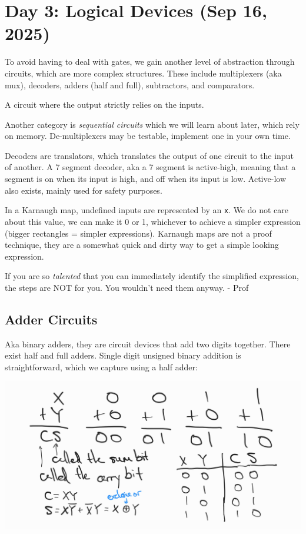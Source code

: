 \section{Day 3: Logical Devices (Sep 16, 2025)}

To avoid having to deal with gates, we gain another level of abstraction through circuits, which are more complex structures. These include multiplexers (aka mux), decoders, adders (half and full), subtractors, and comparators.

\begin{definition}
A circuit where the output strictly relies on the inputs.
\end{definition}

Another category is \textit{sequential circuits} which we will learn about later, which rely on memory. De-multiplexers may be testable, implement one in your own time.

Decoders are translators, which translates the output of one circuit to the input of another. A 7 segment decoder, aka a 7 segment is active-high, meaning that a segment is on when its input is high, and off when its input is low. Active-low also exists, mainly used for safety purposes.

In a Karnaugh map, undefined inputs are represented by an \texttt{x}. We do not care about this value, we can make it 0 or 1, whichever to achieve a simpler expression (bigger rectangles = simpler expressions). Karnaugh maps are not a proof technique, they are a somewhat quick and dirty way to get a simple looking expression. 

\begin{remark}
If you are so \textit{talented} that you can immediately identify the simplified expression, the steps are NOT for you. You wouldn't need them anyway. - Prof
\end{remark}

\subsection{Adder Circuits}

Aka binary adders, they are circuit devices that add two digits together. There exist half and full adders. Single digit unsigned binary addition is straightforward, which we capture using a half adder:

\includegraphics{csc258/figures/halfadderttb.jpg}

